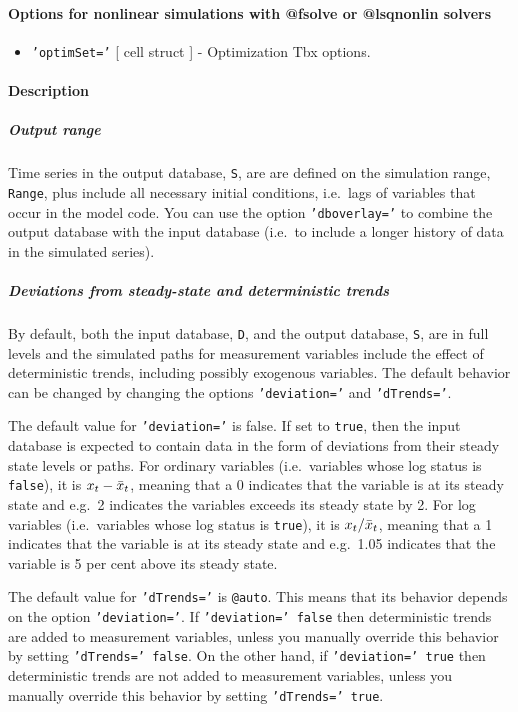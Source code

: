 \paragraph{Options for nonlinear simulations with @fsolve or @lsqnonlin
solvers}

\begin{itemize}
\itemsep1pt\parskip0pt
\item
  \texttt{'optimSet='} {[} cell \textbar{} struct {]} - Optimization Tbx
  options.
\end{itemize}

\paragraph{Description}

\subparagraph{Output range}

Time series in the output database, \texttt{S}, are are defined on the
simulation range, \texttt{Range}, plus include all necessary initial
conditions, i.e.~lags of variables that occur in the model code. You can
use the option \texttt{'dboverlay='} to combine the output database with
the input database (i.e.~to include a longer history of data in the
simulated series).

\subparagraph{Deviations from steady-state and deterministic
trends}

By default, both the input database, \texttt{D}, and the output
database, \texttt{S}, are in full levels and the simulated paths for
measurement variables include the effect of deterministic trends,
including possibly exogenous variables. The default behavior can be
changed by changing the options \texttt{'deviation='} and
\texttt{'dTrends='}.

The default value for \texttt{'deviation='} is false. If set to
\texttt{true}, then the input database is expected to contain data in
the form of deviations from their steady state levels or paths. For
ordinary variables (i.e.~variables whose log status is \texttt{false}),
it is $x_t-\Bar x_t$, meaning that a 0 indicates that the variable is at
its steady state and e.g.~2 indicates the variables exceeds its steady
state by 2. For log variables (i.e.~variables whose log status is
\texttt{true}), it is $x_t/\Bar x_t$, meaning that a 1 indicates that
the variable is at its steady state and e.g.~1.05 indicates that the
variable is 5 per cent above its steady state.

The default value for \texttt{'dTrends='} is \texttt{@auto}. This means
that its behavior depends on the option \texttt{'deviation='}. If
\texttt{'deviation=' false} then deterministic trends are added to
measurement variables, unless you manually override this behavior by
setting \texttt{'dTrends=' false}. On the other hand, if
\texttt{'deviation=' true} then deterministic trends are not added to
measurement variables, unless you manually override this behavior by
setting \texttt{'dTrends=' true}.

